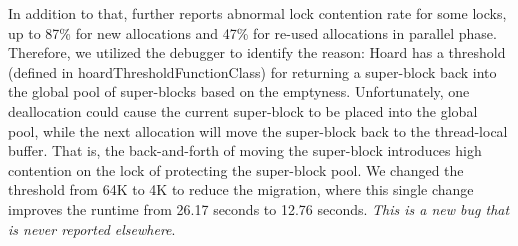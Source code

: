 In addition to that, \MP{} further reports abnormal lock contention rate for some locks, up to 87\% for new allocations and 47\% for re-used allocations in parallel phase. Therefore, we utilized the debugger to identify the reason: Hoard has a threshold (defined in hoardThresholdFunctionClass) for returning a super-block back into the global pool of super-blocks based on the emptyness. Unfortunately, one deallocation could cause the current super-block to be placed into the global pool, while the next allocation will move the super-block back to the thread-local buffer. That is, the back-and-forth of moving the super-block introduces high contention on the lock of protecting the super-block pool. We changed the threshold from 64K to 4K to reduce the migration, where this single change improves the runtime from 26.17 seconds to 12.76 seconds. \textit{This is a new bug that is never reported elsewhere}. 


 

